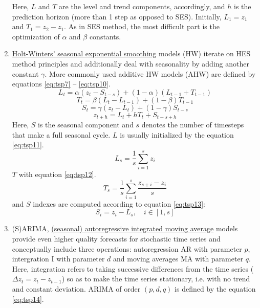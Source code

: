 \documentclass[13pt, a4paper]{article}
\begin{document}
\begin{enumerate}
Here, $L$ and $T$ are the level and trend components, accordingly, and $h$ is the prediction horizon (more than 1 step as opposed to SES). Initially, $L_1 = z_1$ and $T_1 = z_2 - z_1$. As in SES method, the most difficult part is the optimization of $\alpha$ and $\beta$ constants.
\item \underline{Holt-Winters' seasonal exponential smoothing} models (HW) iterate on HES method principles and additionally deal with seasonality by adding another constant $\gamma$. More commonly used additive HW models (AHW) are defined by equations \ref{eq:tsp7} -- \ref{eq:tsp10}.
\begin{equation} \label{eq:tsp7}
L_t = \alpha (z_t - S_{t-s}) + (1-\alpha) (L_{t-1} + T_{t-1})
\end{equation}
\begin{equation} \label{eq:tsp8}
T_t = \beta (L_t - L_{t-1}) + (1-\beta) T_{t-1}
\end{equation}
\begin{equation} \label{eq:tsp9}
S_t = \gamma (z_t - L_t) + (1-\gamma) S_{t-s}
\end{equation}
\begin{equation} \label{eq:tsp10}
z_{t+h} = L_t + hT_t + S_{t-s+h}
\end{equation}
Here, $S$ is the seasonal component and $s$ denotes the number of timesteps that make a full seasonal cycle. $L$ is usually initialized by the equation \ref{eq:tsp11}.
\begin{equation} \label{eq:tsp11}
L_s = \frac{1}{s} \sum_{i=1}^s z_i
\end{equation}
$T$ with equation \ref{eq:tsp12}.
\begin{equation} \label{eq:tsp12}
T_s = \frac{1}{s} \sum_{i=1}^s \frac{z_{s+i} - z_i}{s}
\end{equation}
and $S$ indexes are computed according to equation \ref{eq:tsp13}:
\begin{equation} \label{eq:tsp13}
S_i = z_i - L_s, \quad i \in [1,s]
\end{equation}
\item (S)ARIMA, \underline{(seasonal) autoregressive integrated moving average} models provide even higher quality forecasts for stochastic time series and conceptually include three operations: autoregression AR with parameter $p$, intergration I with parameter $d$ and moving averages MA with parameter $q$. Here, integration refers to taking successive differences from the time series ($\Delta z_t = z_t - z_{t-1}$) so as to make the time series stationary, i.e. with no trend and constant deviation. ARIMA of order $(p,d,q)$ is defined by the equation \ref{eq:tsp14}.

\end{enumerate}
\end{document}
